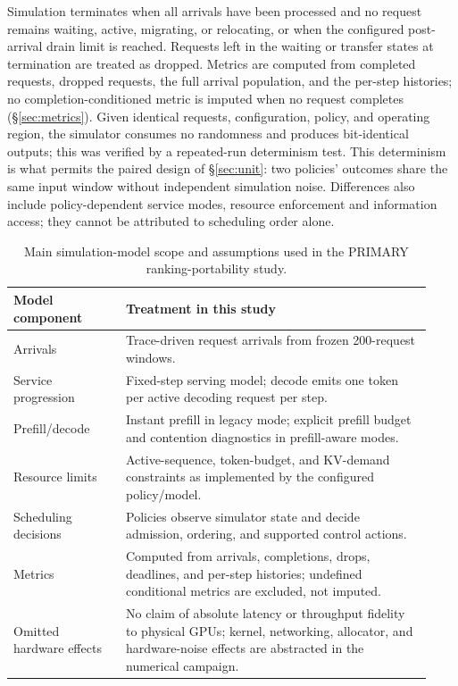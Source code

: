 Simulation terminates when all arrivals have been processed and no request
remains waiting, active, migrating, or relocating, or when the configured
post-arrival drain limit is reached. Requests left in the waiting or
transfer states at termination are treated as dropped. Metrics are computed
from completed requests, dropped requests, the full arrival population, and
the per-step histories; no completion-conditioned metric is imputed when no
request completes (\S\ref{sec:metrics}). Given identical requests,
configuration, policy, and operating region, the simulator consumes no
randomness and produces bit-identical outputs; this was verified by a
repeated-run determinism test. This determinism is what permits the paired
design of \S\ref{sec:unit}: two policies' outcomes share the same input window without independent
simulation noise. Differences also include policy-dependent service modes,
resource enforcement and information access; they cannot be attributed to
scheduling order alone.

\begin{table}[t]
\centering
\caption{Main simulation-model scope and assumptions used in the PRIMARY
ranking-portability study.}
\label{tab:model-assumptions}
\small
\begin{tabular}{p{0.25\linewidth}p{0.68\linewidth}}
\toprule
Model component & Treatment in this study \\
\midrule
Arrivals & Trace-driven request arrivals from frozen 200-request windows. \\
Service progression & Fixed-step serving model; decode emits one token per active decoding request per step. \\
Prefill/decode & Instant prefill in legacy mode; explicit prefill budget and contention diagnostics in prefill-aware modes. \\
Resource limits & Active-sequence, token-budget, and KV-demand constraints as implemented by the configured policy/model. \\
Scheduling decisions & Policies observe simulator state and decide admission, ordering, and supported control actions. \\
Metrics & Computed from arrivals, completions, drops, deadlines, and per-step histories; undefined conditional metrics are excluded, not imputed. \\
Omitted hardware effects & No claim of absolute latency or throughput fidelity to physical GPUs; kernel, networking, allocator, and hardware-noise effects are abstracted in the numerical campaign. \\
\bottomrule
\end{tabular}
\end{table}


